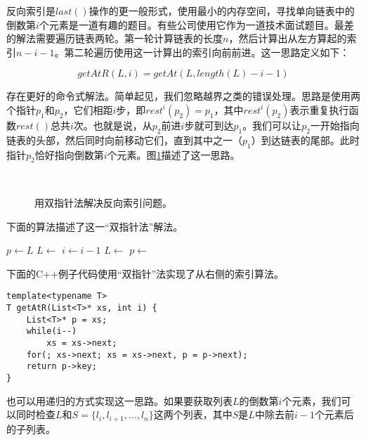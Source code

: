 \documentclass[UTF8]{article}
\begin{document}
反向索引是$last()$操作的更一般形式，使用最小的内存空间，寻找单向链表中的倒数第$i$个元素是一道有趣的题目。有些公司使用它作为一道技术面试题目。最差的解法需要遍历链表两轮。第一轮计算链表的长度$n$，然后计算出从左方算起的索引$n - i - 1$。第二轮遍历使用这一计算出的索引向前前进。这一思路定义如下：

\[
  getAtR(L, i) = getAt(L, length(L) - i -1)
\]

存在更好的命令式解法。简单起见，我们忽略越界之类的错误处理。思路是使用两个指针$p_1$和$p_2$，它们相距$i$步，即$rest^i(p_2) = p_1$，其中$rest^i(p_2)$表示重复执行函数$rest()$总共$i$次。也就是说，从$p_2$前进$i$步就可到达$p_1$。我们可以让$p_2$一开始指向链表的头部，然后同时向前移动它们，直到其中之一（$p_1$）到达链表的尾部。此时指针$p_2$恰好指向倒数第$i$个元素。图\ref{fig:list-rindex}描述了这一思路。

\begin{figure}[htbp]
    \centering
     \\
    \caption{用双指针法解决反向索引问题。} \label{fig:list-rindex}
\end{figure}

下面的算法描述了这一“双指针法”解法。

\begin{algorithmic}[1]
  \State $p \gets L$
    \State $L \gets $ 
    \State $i \gets i - 1$
  \EndWhile
    \State $L \gets$ 
    \State $p \gets$ 
  \EndWhile
  \State \Return {}
\EndFunction
\end{algorithmic}

下面的C++例子代码使用“双指针”法实现了从右侧的索引算法。

\lstset{language=C++}
\begin{lstlisting}
template<typename T>
T getAtR(List<T>* xs, int i) {
    List<T>* p = xs;
    while(i--)
        xs = xs->next;
    for(; xs->next; xs = xs->next, p = p->next);
    return p->key;
}
\end{lstlisting}

也可以用递归的方式实现这一思路。如果要获取列表$L$的倒数第$i$个元素，我们可以同时检查$L$和$S=\{l_i, l_{i+1}, ..., l_n\}$这两个列表，其中$S$是$L$中除去前$i-1$个元素后的子列表。
\end{document}
